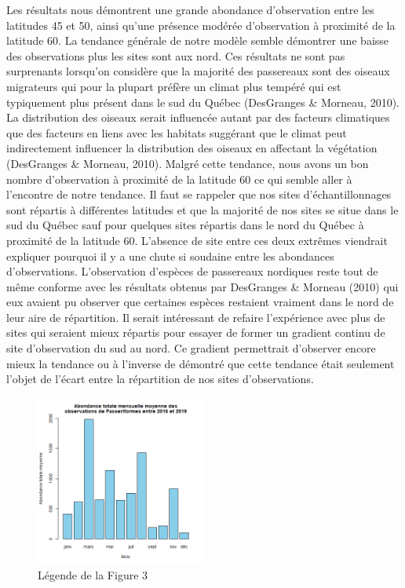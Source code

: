 \documentclass[9pt,twocolumn,twoside,]{pnas-new}
\begin{document}
Les résultats nous démontrent une grande abondance d'observation entre
les latitudes 45 et 50, ainsi qu'une présence modérée d'observation à
proximité de la latitude 60. La tendance générale de notre modèle semble
démontrer une baisse des observations plus les sites sont aux nord. Ces
résultats ne sont pas surprenants lorsqu'on considère que la majorité
des passereaux sont des oiseaux migrateurs qui pour la plupart préfère
un climat plus tempéré qui est typiquement plus présent dans le sud du
Québec (DesGranges \& Morneau, 2010). La distribution des oiseaux serait
influencée autant par des facteurs climatiques que des facteurs en liens
avec les habitats suggérant que le climat peut indirectement influencer
la distribution des oiseaux en affectant la végétation (DesGranges \&
Morneau, 2010). Malgré cette tendance, nous avons un bon nombre
d'observation à proximité de la latitude 60 ce qui semble aller à
l'encontre de notre tendance. Il faut se rappeler que nos sites
d'échantillonnages sont répartis à différentes latitudes et que la
majorité de nos sites se situe dans le sud du Québec sauf pour quelques
sites répartis dans le nord du Québec à proximité de la latitude 60.
L'absence de site entre ces deux extrêmes viendrait expliquer pourquoi
il y a une chute si soudaine entre les abondances d'observations.
L'observation d'espèces de passereaux nordiques reste tout de même
conforme avec les résultats obtenus par DesGranges \& Morneau (2010) qui
eux avaient pu observer que certaines espèces restaient vraiment dans le
nord de leur aire de répartition. Il serait intéressant de refaire
l'expérience avec plus de sites qui seraient mieux répartis pour essayer
de former un gradient continu de site d'observation du sud au nord. Ce
gradient permettrait d'observer encore mieux la tendance ou à l'inverse
de démontré que cette tendance était seulement l'objet de l'écart entre
la répartition de nos sites d'observations.

\begin{figure}
\centering
\includegraphics[width=0.5\textwidth,height=0.4\textheight]{Figure4.png}
\caption{Légende de la Figure 3}
\end{figure}
\end{document}
